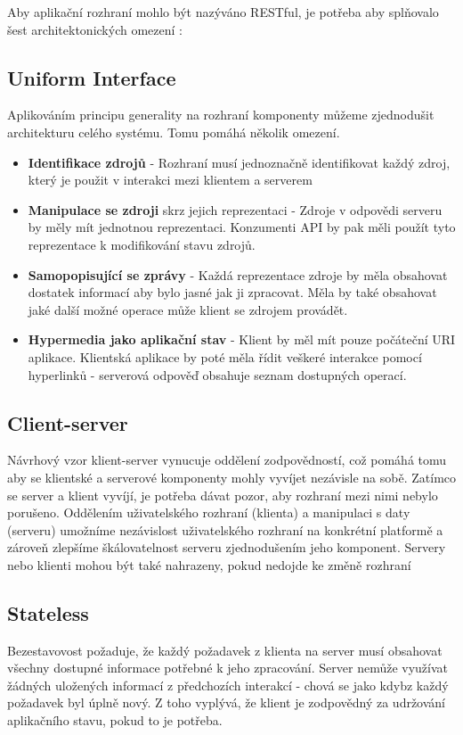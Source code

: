 \documentclass[thesis=M,czech]{FITthesis}[2019/12/23]
\begin{document}
Aby aplikační rozhraní mohlo být nazýváno RESTful, je potřeba aby splňovalo šest architektonických omezení \cite{restful_api}:

\subsection{Uniform Interface}
Aplikováním principu generality na rozhraní komponenty můžeme zjednodušit architekturu celého systému. Tomu pomáhá několik omezení.
\begin{itemize}
    \item \textbf{Identifikace zdrojů} - Rozhraní musí jednoznačně identifikovat každý zdroj, který je použit v interakci mezi klientem a serverem
    \item \textbf{Manipulace se zdroji} skrz jejich reprezentaci - Zdroje v odpovědi serveru by měly mít jednotnou reprezentaci. Konzumenti API by pak měli použít tyto reprezentace k modifikování stavu zdrojů.
    \item \textbf{Samopopisující se zprávy} - Každá reprezentace zdroje by měla obsahovat dostatek informací aby bylo jasné jak ji zpracovat. Měla by také obsahovat jaké další možné operace může klient se zdrojem provádět.
    \item \textbf{Hypermedia jako aplikační stav} - Klient by měl mít pouze počáteční URI aplikace. Klientská aplikace by poté měla řídit veškeré interakce pomocí hyperlinků - serverová odpověď obsahuje seznam dostupných operací.
\end{itemize}

\subsection{Client-server}
Návrhový vzor klient-server vynucuje oddělení zodpovědností, což pomáhá tomu aby se klientské a serverové komponenty mohly vyvíjet nezávisle na sobě. Zatímco se server a klient vyvíjí, je potřeba dávat pozor, aby rozhraní mezi nimi nebylo porušeno.
Oddělením uživatelského rozhraní (klienta) a manipulaci s daty (serveru) umožníme nezávislost uživatelského rozhraní na konkrétní platformě a zároveň zlepšíme škálovatelnost serveru zjednodušením jeho komponent. Servery nebo klienti mohou být také nahrazeny, pokud nedojde ke změně rozhraní

\subsection{Stateless}
Bezestavovost požaduje, že každý požadavek z klienta na server musí obsahovat všechny dostupné informace potřebné k jeho zpracování. Server nemůže využívat žádných uložených informací z předchozích interakcí - chová se jako kdybz každý požadavek byl úplně nový. Z toho vyplývá, že klient je zodpovědný za udržování aplikačního stavu, pokud to je potřeba.
\end{document}
